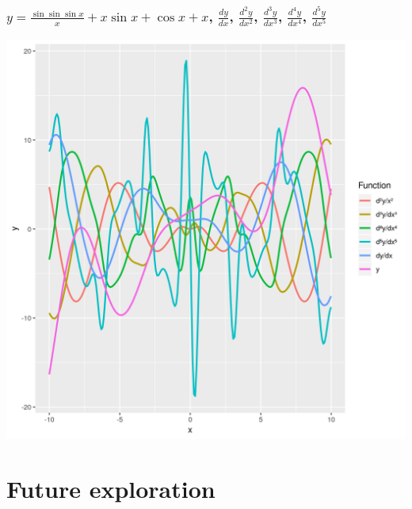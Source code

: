 \documentclass{beamer}
\begin{document}
    \begin{frame}
        \frametitle{$y = \frac{\sin{\sin{\sin{x}}}}{x} + x \sin{x} + \cos{x} + x$, $\frac{dy}{dx}$, $\frac{d^{2}y}{dx^2}$, $\frac{d^{3}y}{dx^3}$, $\frac{d^{4}y}{dx^4}$, $\frac{d^{5}y}{dx^5}$}
        \begin{center}
            \includegraphics[scale=0.4]{plot.png}
        \end{center}
    \end{frame}

    \section{Future exploration}\label{sec:fifth-section}
\end{document}

